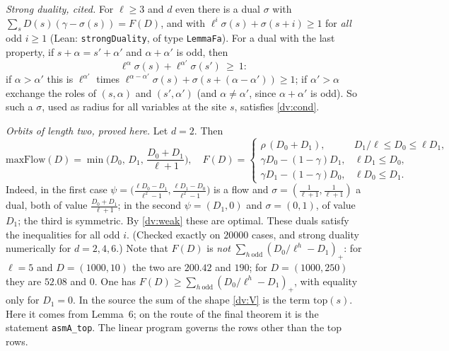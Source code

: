 \documentclass[11pt,letterpaper]{article}
\begin{document}
\emph{Strong duality, cited.} For $\ell\ge3$ and $d$ even there is a dual $\sigma$ with
$\sum_sD(s)(\gamma-\sigma(s))=F(D)$, and with $\ell^i\sigma(s)+\sigma(s+i)\ge1$ for \emph{all} odd $i\ge1$
(Lean: \texttt{strongDuality}, of type \texttt{LemmaFa}). For a dual with the last property, if
$s+\alpha=s'+\alpha'$ and $\alpha+\alpha'$ is odd, then
\begin{equation}\label{dv:rad}
 \ell^\alpha\sigma(s)+\ell^{\alpha'}\sigma(s')\ \ge\ 1:
\end{equation}
if $\alpha>\alpha'$ this is $\ell^{\alpha'}$ times $\ell^{\alpha-\alpha'}\sigma(s)+\sigma(s+(\alpha-\alpha'))\ge1$;
if $\alpha'>\alpha$ exchange the roles of $(s,\alpha)$ and $(s',\alpha')$ (and $\alpha\ne\alpha'$, since
$\alpha+\alpha'$ is odd).
So such a $\sigma$, used as radius for all variables at the site $s$, satisfies \eqref{dv:cond}.

\emph{Orbits of length two, proved here.} Let $d=2$. Then
\begin{equation}\label{dv:d2}
 \mathrm{maxFlow}(D)=\min\Big(D_0,\,D_1,\,\frac{D_0+D_1}{\ell+1}\Big),\quad
 F(D)=\begin{cases}\rho\,(D_0+D_1),&D_1/\ell\le D_0\le\ell D_1,\\
 \gamma D_0-(1-\gamma)D_1,&\ell D_1\le D_0,\\ \gamma D_1-(1-\gamma)D_0,&\ell D_0\le D_1.\end{cases}
\end{equation}
Indeed, in the first case $\psi=\big(\frac{\ell D_0-D_1}{\ell^2-1},\frac{\ell D_1-D_0}{\ell^2-1}\big)$ is a flow
and $\sigma=(\frac1{\ell+1},\frac1{\ell+1})$ a dual, both of value $\frac{D_0+D_1}{\ell+1}$; in the second
$\psi=(D_1,0)$ and $\sigma=(0,1)$, of value $D_1$; the third is symmetric. By \eqref{dv:weak} these are optimal.
These duals satisfy the inequalities for all odd $i$. (Checked exactly on $20000$ cases, and strong duality
numerically for $d=2,4,6$.) Note that $F(D)$ is \emph{not} $\sum_{h\ \mathrm{odd}}(D_0/\ell^h-D_1)_+$:
for $\ell=5$ and $D=(1000,10)$ the two are $200.42$ and $190$; for $D=(1000,250)$ they are $52.08$ and $0$.
One has $F(D)\ge\sum_{h\ \mathrm{odd}}(D_0/\ell^h-D_1)_+$, with equality only for $D_1=0$. In the source the
sum of the shape \eqref{dv:V} is the term $\mathrm{top}(s)$. Here it comes from Lemma~6; on the route of the final theorem it is the statement \texttt{asmA\_top}. The linear program
governs the rows other than the top rows.
\end{document}
